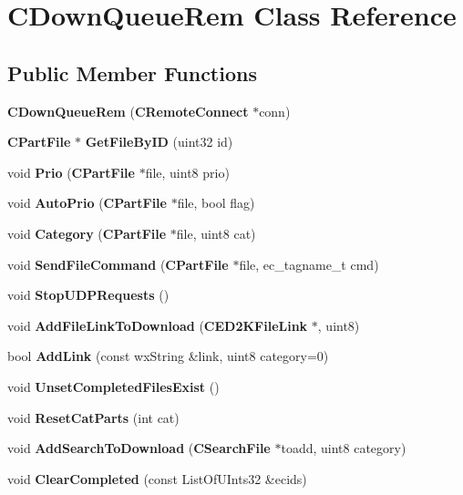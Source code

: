 \section{CDownQueueRem Class Reference}
\label{classCDownQueueRem}
\subsection*{Public Member Functions}
\begin{DoxyCompactItemize}
\item 
{\bfseries CDownQueueRem} ({\bf CRemoteConnect} $\ast$conn)\label{classCDownQueueRem_a54c2eb8c07156707972849b395f8b7f8}

\item 
{\bf CPartFile} $\ast$ {\bfseries GetFileByID} (uint32 id)\label{classCDownQueueRem_a8fbb6ed008dc5097bf9b0839dd56b4d5}

\item 
void {\bfseries Prio} ({\bf CPartFile} $\ast$file, uint8 prio)\label{classCDownQueueRem_a0ab7a561fc11fae55039e69f4fae74df}

\item 
void {\bfseries AutoPrio} ({\bf CPartFile} $\ast$file, bool flag)\label{classCDownQueueRem_ac3760065dc8a4a7a016650f1fb4be83f}

\item 
void {\bfseries Category} ({\bf CPartFile} $\ast$file, uint8 cat)\label{classCDownQueueRem_a5be3f6c43a3c694f4c4714f0a3d77eae}

\item 
void {\bfseries SendFileCommand} ({\bf CPartFile} $\ast$file, ec\_\-tagname\_\-t cmd)\label{classCDownQueueRem_a97a47fcfb803c029b03f211d0473a81f}

\item 
void {\bfseries StopUDPRequests} ()\label{classCDownQueueRem_a1253b80ad7475ac1d5cd279780cdad99}

\item 
void {\bfseries AddFileLinkToDownload} ({\bf CED2KFileLink} $\ast$, uint8)\label{classCDownQueueRem_abe0d0e6b7201f758d1ba4ad38cc8ec03}

\item 
bool {\bfseries AddLink} (const wxString \&link, uint8 category=0)\label{classCDownQueueRem_a1a764096ef84c06bfcec9886ce2cad7a}

\item 
void {\bfseries UnsetCompletedFilesExist} ()\label{classCDownQueueRem_a5ab0e24a1db51164a087c3eb1c5f6bf6}

\item 
void {\bfseries ResetCatParts} (int cat)\label{classCDownQueueRem_ab95349608fe9ca8e86daa8acf5396de3}

\item 
void {\bfseries AddSearchToDownload} ({\bf CSearchFile} $\ast$toadd, uint8 category)\label{classCDownQueueRem_a23ab482d969b7f84e075215ec7fa2f92}

\item 
void {\bfseries ClearCompleted} (const ListOfUInts32 \&ecids)\label{classCDownQueueRem_adf7cffb47d7b29a4a1fb8c91421e9116}

\end{DoxyCompactItemize}
